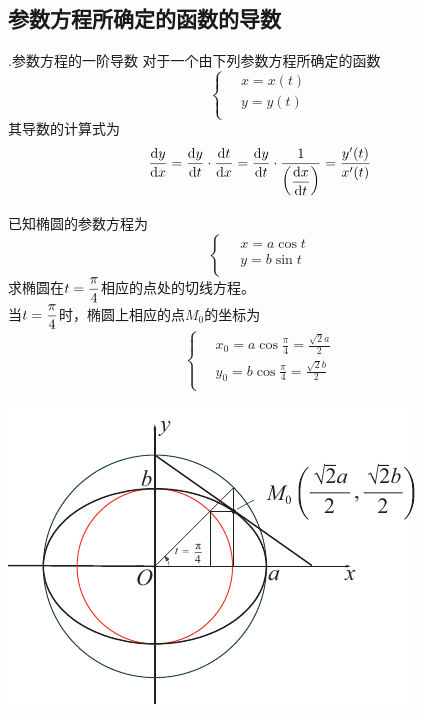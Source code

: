 \subsection{参数方程所确定的函数的导数}
.\enspace 参数方程的一阶导数
对于一个由下列参数方程所确定的函数
\begin{equation}
	\nonumber
	\left\{ \begin{aligned}
		&\, x=x(t)\\
		&\, y=y (t)\\
	\end{aligned}\right.
\end{equation}
其导数的计算式为
\begin{equation}
	\frac{{\rm{d}} y}{{\rm{d}} x}=\frac{{\rm{d}} y}{{\rm{d}} t}\cdot \frac{{\rm{d}} t}{{\rm{d}} x}=\frac{{\rm{d}} y}{{\rm{d}} t}\cdot\frac{1}{\bigg(\displaystyle\frac{{\rm{d}} x}{{\rm{d}} t}\bigg)}=\frac{y'(t)}{x'(t)}
\end{equation}
\clearpage
\vspace*{-1em}
\begin{minipage}{0.57\linewidth}
\examples 已知椭圆的参数方程为
\begin{equation}
	\nonumber
	\left\{ \begin{aligned}
		&\, x=a\cos t\\
		&\, y=b\sin t\\
	\end{aligned}\right.
\end{equation}
	求椭圆在$t=\displaystyle\frac{\pi}{4}$相应的点处的切线方程。\\[0.5em]
\solve 当$t=\displaystyle\frac{\pi}{4}$时，椭圆上相应的点$M_0$的坐标为
\vspace*{-1.2em}
\begin{equation}
	\nonumber
	\left\{ \begin{aligned}
		&\, x_0=a\cos \frac{\pi}{4}=\frac{\sqrt{2}a}{2}\\[0.5em]
		&\, y_0=b\cos \frac{\pi}{4}=\frac{\sqrt{2}b}{2}\\
	\end{aligned}\right.
\end{equation}
\end{minipage}
\begin{minipage}{0.35\linewidth}
	\centering
	\includegraphics[width=\linewidth]{pic/C-2/椭圆切线}
	\vspace*{-2em}
\end{minipage}

